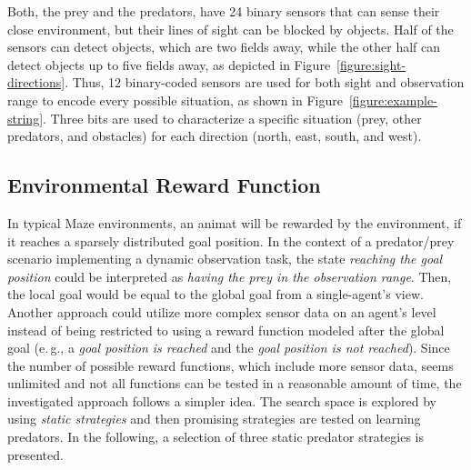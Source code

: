 Both, the prey and the predators, have 24 binary sensors that can sense their close environment, but their lines of sight can be blocked by objects. Half of the sensors can detect objects, which are two fields away, while the other half can detect objects up to five fields away, as depicted in Figure~\ref{figure:sight-directions}. %
Thus, 12 binary-coded sensors are used for both sight and observation range to encode every possible situation, as shown in Figure~\ref{figure:example-string}. Three bits are used to characterize a specific situation (prey, other predators, and obstacles) for each direction (north, east, south, and west). 

\subsection{Environmental Reward Function}
\label{subsection:environment-reward-function}

In typical Maze environments, an animat will be rewarded by the environment, if it reaches a sparsely distributed goal position. In the context of a predator/prey scenario implementing a dynamic observation task, the state \emph{reaching the goal position} could be interpreted as \emph{having the prey in the observation range}. Then, the local goal would be equal to the global goal from a single-agent's view. Another approach could utilize more complex sensor data on an agent's level instead of being restricted to using a reward function modeled after the global goal (e.\,g., a \emph{goal position is reached} and the \emph{goal position is not reached}). Since the number of possible reward functions, which include more sensor data, seems unlimited and not all functions can be tested in a reasonable amount of time, the investigated approach follows a simpler idea. The search space is explored by using \emph{static strategies} and then promising strategies are tested on learning predators. In the following, a selection of three static predator strategies is presented. 


